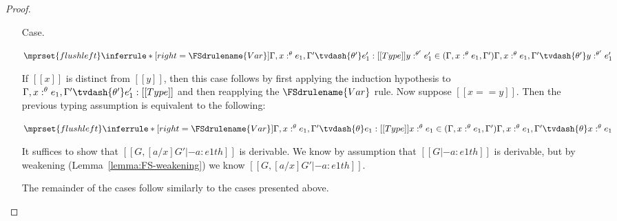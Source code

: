 \begin{proof}
\begin{itemize}
  \item[Case.]\ \\
     \begin{center}
       \begin{math}
         $$\mprset{flushleft}
         \inferrule* [right=\FSdrulename{Var}]{
           \Gamma,x:^\theta e_1,\Gamma' \tvdash{\theta'} e'_1:[[Type]]
           \\\\
           y:^{\theta'} e'_1 \in (\Gamma,x:^\theta e_1,\Gamma')
         }{\Gamma,x:^\theta e_1,\Gamma' \tvdash{\theta'} y:^{\theta'} e'_1}
       \end{math}
     \end{center}
     If $[[x]]$ is distinct from $[[y]]$, then this case follows by first applying the
     induction hypothesis to $\Gamma,x:^\theta e_1,\Gamma' \tvdash{\theta'} e'_1:[[Type]]$
     and then reapplying the $\FSdrulename{Var}$ rule.  Now suppose $[[x == y]]$.  Then the
     previous typing assumption is equivalent to the following:
     \begin{center}
       \begin{math}
         $$\mprset{flushleft}
         \inferrule* [right=\FSdrulename{Var}]{
           \Gamma,x:^\theta e_1,\Gamma' \tvdash{\theta} e_1:[[Type]]
           \\\\
           x:^{\theta} e_1 \in (\Gamma,x:^\theta e_1,\Gamma')
         }{\Gamma,x:^\theta e_1,\Gamma' \tvdash{\theta} x:^{\theta} e_1}
       \end{math}
     \end{center}
     It suffices to show that $[[G, [a/x]G' |- a : e1 th]]$ is
     derivable.  We know by assumption that $[[G |- a : e1 th]]$ is
     derivable, but by weakening (Lemma~\ref{lemma:FS-weakening}) we
     know $[[G, [a/x]G' |- a : e1 th]]$.

     The remainder of the cases follow similarly to the cases
     presented above.
  \end{itemize}
\end{proof}
